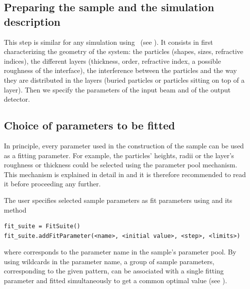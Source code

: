 %
\subsection{Preparing the sample and the simulation description}

This step is similar for any simulation using \BornAgain\ (see ). It consists in first characterizing  the geometry of the system: the particles 
(shapes, sizes, refractive
indices), the different layers (thickness,
order, refractive index, a possible roughness of the interface), the
interference between the particles and the way they are distributed in
the layers (buried particles or particles sitting on top of a
layer). 
Then we specify the parameters of the input beam and of the
output detector.


%
\subsection{Choice of parameters to be fitted}
In principle, every parameter used in the construction of the sample
can be used as a fitting parameter. For example, the particles'
heights, radii or the layer's roughness or thickness could be selected
using the 
parameter pool mechanism. 
This mechanism is explained in detail in
 and it is therefore recommended
to read it before proceeding any further.

The user specifies selected sample parameters as fit parameters using 
and its  method
\begin{lstlisting}[language=shell, style=commandline]
fit_suite = FitSuite()
fit_suite.addFitParameter(<name>, <initial value>, <step>, <limits>)
\end{lstlisting}
where  corresponds to the parameter name in the sample's parameter pool.
By using wildcards in the parameter name, a group of sample parameters, corresponding to the given
pattern, can be associated with a single fitting parameter and 
fitted simultaneously to get a common optimal value (see ).

